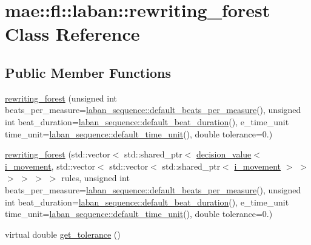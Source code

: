 \hypertarget{classmae_1_1fl_1_1laban_1_1rewriting__forest}{\section{mae\-:\-:fl\-:\-:laban\-:\-:rewriting\-\_\-forest Class Reference}
\label{classmae_1_1fl_1_1laban_1_1rewriting__forest}
}
\subsection*{Public Member Functions}
\begin{DoxyCompactItemize}
\item 
\hyperlink{classmae_1_1fl_1_1laban_1_1rewriting__forest_a0eb4a90941ad2a400682a03e3abd136e}{rewriting\-\_\-forest} (unsigned int beats\-\_\-per\-\_\-measure=\hyperlink{classmae_1_1fl_1_1laban_1_1laban__sequence_a2e64362d5cfeb89eb8545cb064e63170}{laban\-\_\-sequence\-::default\-\_\-beats\-\_\-per\-\_\-measure}(), unsigned int beat\-\_\-duration=\hyperlink{classmae_1_1fl_1_1laban_1_1laban__sequence_ac7bf04cdac0c3aed6b8ee4a887e561d9}{laban\-\_\-sequence\-::default\-\_\-beat\-\_\-duration}(), e\-\_\-time\-\_\-unit time\-\_\-unit=\hyperlink{classmae_1_1fl_1_1laban_1_1laban__sequence_ada28215d43d85e983fe6129e9816eed2}{laban\-\_\-sequence\-::default\-\_\-time\-\_\-unit}(), double tolerance=0.)
\item 
\hyperlink{classmae_1_1fl_1_1laban_1_1rewriting__forest_aa7d56018ed383a4d56d597761d5b8860}{rewriting\-\_\-forest} (std\-::vector$<$ std\-::shared\-\_\-ptr$<$ \hyperlink{classmae_1_1fl_1_1laban_1_1decision__value}{decision\-\_\-value}$<$ \hyperlink{classmae_1_1fl_1_1laban_1_1i__movement}{i\-\_\-movement}, std\-::vector$<$ std\-::vector$<$ std\-::shared\-\_\-ptr$<$ \hyperlink{classmae_1_1fl_1_1laban_1_1i__movement}{i\-\_\-movement} $>$ $>$ $>$ $>$ $>$ $>$ rules, unsigned int beats\-\_\-per\-\_\-measure=\hyperlink{classmae_1_1fl_1_1laban_1_1laban__sequence_a2e64362d5cfeb89eb8545cb064e63170}{laban\-\_\-sequence\-::default\-\_\-beats\-\_\-per\-\_\-measure}(), unsigned int beat\-\_\-duration=\hyperlink{classmae_1_1fl_1_1laban_1_1laban__sequence_ac7bf04cdac0c3aed6b8ee4a887e561d9}{laban\-\_\-sequence\-::default\-\_\-beat\-\_\-duration}(), e\-\_\-time\-\_\-unit time\-\_\-unit=\hyperlink{classmae_1_1fl_1_1laban_1_1laban__sequence_ada28215d43d85e983fe6129e9816eed2}{laban\-\_\-sequence\-::default\-\_\-time\-\_\-unit}(), double tolerance=0.)
\item 
virtual double \hyperlink{classmae_1_1fl_1_1laban_1_1rewriting__forest_ac919e5e07a781165e39a710d27346b1c}{get\-\_\-tolerance} ()

\end{DoxyCompactItemize}
